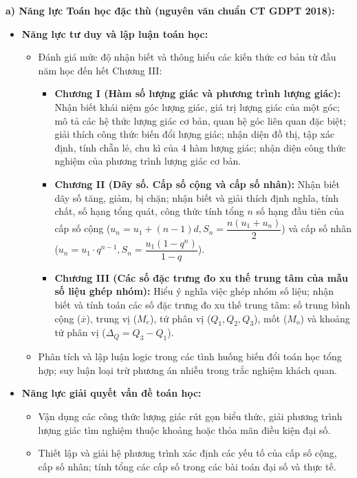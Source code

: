 \documentclass[12pt, a4paper]{article}
\begin{document}
\textbf{a) Năng lực Toán học đặc thù (nguyên văn chuẩn CT GDPT 2018):}
\begin{itemize}[leftmargin=1.5em]
    \item \textbf{Năng lực tư duy và lập luận toán học:}
    \begin{itemize}
        \item Đánh giá mức độ nhận biết và thông hiểu các kiến thức cơ bản từ đầu năm học đến hết Chương III:
        \begin{itemize}
            \item \textbf{Chương I (Hàm số lượng giác và phương trình lượng giác):} Nhận biết khái niệm góc lượng giác, giá trị lượng giác của một góc; mô tả các hệ thức lượng giác cơ bản, quan hệ góc liên quan đặc biệt; giải thích công thức biến đổi lượng giác; nhận diện đồ thị, tập xác định, tính chẵn lẻ, chu kì của 4 hàm lượng giác; nhận diện công thức nghiệm của phương trình lượng giác cơ bản.
            \item \textbf{Chương II (Dãy số. Cấp số cộng và cấp số nhân):} Nhận biết dãy số tăng, giảm, bị chặn; nhận biết và giải thích định nghĩa, tính chất, số hạng tổng quát, công thức tính tổng $n$ số hạng đầu tiên của cấp số cộng ($u_n = u_1 + (n - 1)d, S_n = \dfrac{n(u_1 + u_n)}{2}$) và cấp số nhân ($u_n = u_1 \cdot q^{n-1}, S_n = \dfrac{u_1(1 - q^n)}{1 - q}$).
            \item \textbf{Chương III (Các số đặc trưng đo xu thế trung tâm của mẫu số liệu ghép nhóm):} Hiểu ý nghĩa việc ghép nhóm số liệu; nhận biết và tính toán các số đặc trưng đo xu thế trung tâm: số trung bình cộng ($\overline{x}$), trung vị ($M_e$), tứ phân vị ($Q_1, Q_2, Q_3$), mốt ($M_o$) và khoảng tứ phân vị ($\Delta_Q = Q_3 - Q_1$).
        \end{itemize}
        \item Phân tích và lập luận logic trong các tình huống biến đổi toán học tổng hợp; suy luận loại trừ phương án nhiễu trong trắc nghiệm khách quan.
    \end{itemize}
    \item \textbf{Năng lực giải quyết vấn đề toán học:}
    \begin{itemize}
        \item Vận dụng các công thức lượng giác rút gọn biểu thức, giải phương trình lượng giác tìm nghiệm thuộc khoảng hoặc thỏa mãn điều kiện đại số.
        \item Thiết lập và giải hệ phương trình xác định các yếu tố của cấp số cộng, cấp số nhân; tính tổng các cấp số trong các bài toán đại số và thực tế.

\end{itemize}
\end{itemize}
\end{document}
